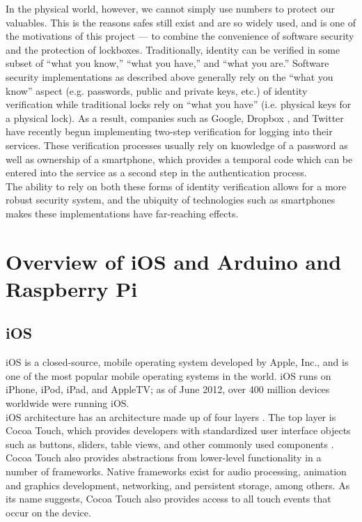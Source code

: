 \documentclass[10pt]{article}
\begin{document}
\begin{multicols}{2}
In the physical world, however, we cannot simply use numbers to protect our valuables. This is the reasons safes still exist and are so widely used, and is one of the motivations of this project --- to combine the convenience of software security and the protection of lockboxes. Traditionally, identity can be verified in some subset of ``what you know,'' ``what you have,'' and ``what you are.''  \cite{codinghorror} Software security implementations as described above generally rely on the ``what you know'' aspect (e.g. passwords, public and private keys, etc.) of identity verification while traditional locks rely on ``what you have'' (i.e. physical keys for a physical lock). As a result, companies  such as Google, Dropbox \cite{dropboxtwostep}, and Twitter \cite{twittertwostep} have recently begun implementing two-step verification for logging into their services. These verification processes usually rely on knowledge of a password as well as ownership of a smartphone, which provides a temporal code which can be entered into the service as a second step in the authentication process. \\

The ability to rely on both these forms of identity verification allows for a more robust security system, and the ubiquity of technologies such as smartphones makes these implementations have far-reaching effects.\\

\section{Overview of iOS and Arduino and Raspberry Pi}

\subsection{iOS}

iOS is a closed-source, mobile operating system developed by Apple, Inc., and is one of the most popular mobile operating systems in the world. iOS runs on iPhone, iPod, iPad, and AppleTV; as of June 2012, over 400 million devices worldwide were running iOS. \cite{applenums}\\

iOS architecture has an architecture made up of four layers \cite{iosoverview}. The top layer is Cocoa Touch, which provides developers with standardized user interface objects such as buttons, sliders, table views, and other commonly used components \cite{cocoatouch}. Cocoa Touch also provides abstractions from lower-level functionality in a number of frameworks. Native frameworks exist for audio processing, animation and graphics development, networking, and persistent storage, among others. As its name suggests, Cocoa Touch also provides access to all touch events that occur on the device.\\


\end{multicols}
\end{document}
